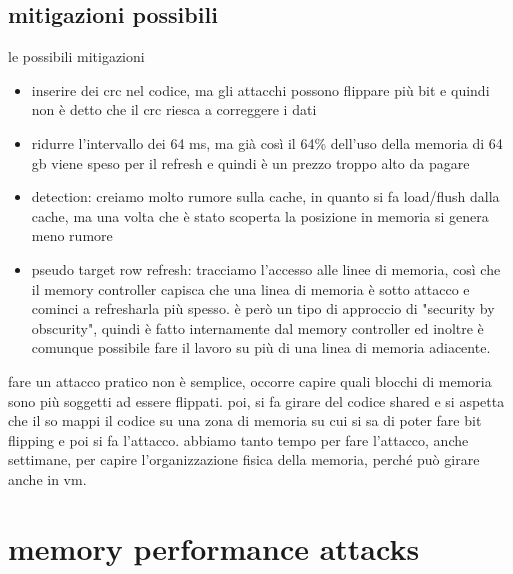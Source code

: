 \documentclass[12pt, oneside]{extbook} %
\begin{document}
\subsection{mitigazioni possibili}
le possibili mitigazioni
\begin{itemize}
\item inserire dei crc nel codice, ma gli attacchi possono flippare più bit e quindi non è detto che il crc riesca a correggere i dati
\item ridurre l'intervallo dei 64 ms, ma già così il 64\% dell'uso della memoria di 64 gb viene speso per il refresh e quindi è un prezzo troppo alto da pagare
\item detection: creiamo molto rumore sulla cache, in quanto si fa load/flush dalla cache, ma una volta che è stato scoperta la posizione in memoria si genera meno rumore
\item  pseudo target row refresh: tracciamo l'accesso alle linee di memoria, così che il memory controller capisca che una linea di memoria è sotto attacco e cominci a refresharla più spesso. è però un tipo di approccio di "security by obscurity", quindi è fatto internamente dal memory controller ed inoltre è comunque possibile fare il lavoro su più di una linea di memoria adiacente.
\end{itemize}
fare un attacco pratico non è semplice, occorre capire quali blocchi di memoria sono più soggetti ad essere flippati. poi, si fa girare del codice shared e si aspetta che il so mappi il codice su una zona di memoria su cui si sa di poter fare bit flipping e poi si fa l'attacco. abbiamo tanto tempo per fare l'attacco, anche settimane, per capire l'organizzazione fisica della memoria, perché può girare anche in vm.

\section{memory performance attacks}
\end{document}
